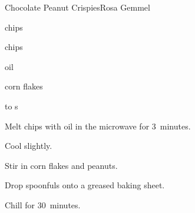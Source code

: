 \begin{recipe}{Chocolate Peanut Crispies}{Rosa Gemmel}{}

\begin{ingredients}
\item {}  chips
\item {}  chips
\item {} oil
\item \C{3\half} corn flakes 
\item \half{} to  s
\end{ingredients}

\begin{directions}
\item Melt chips with oil in the microwave for 3~minutes.
\item Cool slightly.
\item Stir in corn flakes and peanuts.
\item Drop spoonfuls onto a greased baking sheet.
\item Chill for 30~minutes.
\end{directions}

\end{recipe}
